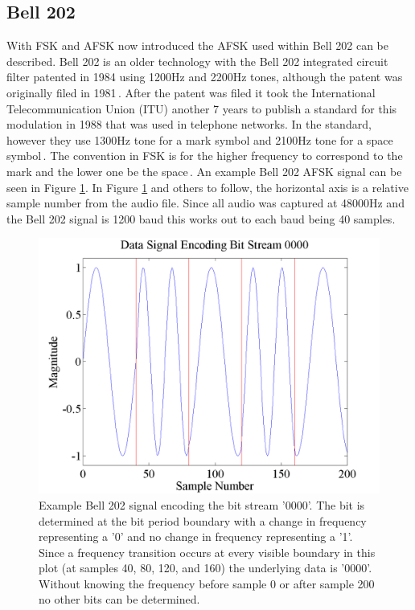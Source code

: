 \subsection{Bell 202}
With FSK and AFSK now introduced the AFSK used within Bell 202 can be described. Bell 202 is an older technology with the Bell 202 integrated circuit filter patented in 1984 using 1200Hz and 2200Hz tones, although the patent was originally filed in 1981\,\cite{stauffer1984fsk}. After the patent was filed it took the International Telecommunication Union (ITU) another 7 years to publish a standard for this modulation in 1988 that was used in telephone networks. In the standard, however they use 1300Hz tone for a mark symbol and 2100Hz tone for a space symbol\,\cite{ITUV23}. The convention in FSK is for the higher frequency to correspond to the mark and the lower one be the space\,\cite{Watson1980}. An example Bell 202 AFSK signal can be seen in Figure \ref{exampleBitStream}. In Figure \ref{exampleBitStream} and others to follow, the horizontal axis is a relative sample number from the audio file. Since all audio was captured at 48000Hz and the Bell 202 signal is 1200 baud this works out to each baud being 40 samples. 
\begin{figure}
  \centering
	\includegraphics[width=0.75\linewidth]{images/Datasignalencodingbitstream0000.png} 
	\caption[Example Bell 202 signal encoding the bit stream '0000'.]{Example Bell 202 signal encoding the bit stream '0000'. The bit is determined at the bit period boundary with a change in frequency representing a '0' and no change in frequency representing a '1'. Since a frequency transition occurs at every visible boundary in this plot (at samples 40, 80, 120, and 160) the underlying data is '0000'. Without knowing the frequency before sample 0 or after sample 200 no other bits can be determined.}
	\label{exampleBitStream}
\end{figure}
